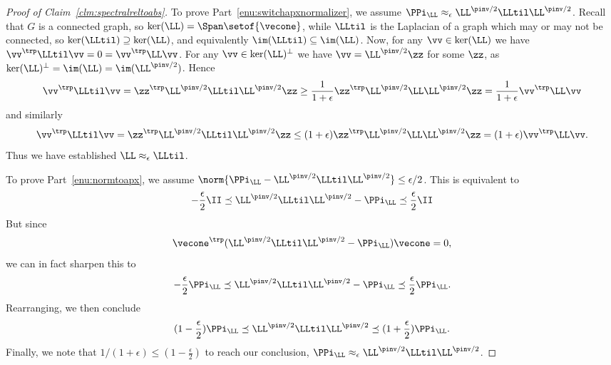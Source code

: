 \begin{proof}[Proof of Claim~\ref{clm:spectralreltoabs}]
  To prove Part~\ref{enu:switchapxnormalizer}, we
  assume $\PPi_{\LL} \approx_{\epsilon}
  \LL^{\pinv/2}\LLtil\LL^{\pinv/2}$.
  Recall that $G$ is a connected graph, so $\ker(\LL) =
  \Span\setof{\vecone}$, while $\LLtil$ is the Laplacian of a graph
which may or may not be connected, so $\ker(\LLtil) \supseteq
\ker(\LL)$, and equivalently $\im(\LLtil) \subseteq \im(\LL)$.
  Now, for any $\vv \in \ker(\LL)$ we have
  $\vv^{\trp} \LLtil \vv = 0 = \vv^{\trp} \LL \vv$.
  For any $\vv \in \ker(\LL)^{\perp}$ we have
  $\vv = \LL^{\pinv/2} \zz$ for some $\zz$, as $\ker(\LL)^{\perp} =
  \im(\LL) = \im(\LL^{\pinv/2})$.
  Hence
  \[
    \vv^{\trp} \LLtil \vv =
    \zz^{\trp} \LL^{\pinv/2}\LLtil\LL^{\pinv/2} \zz
    \geq
    \frac{1}{1+\epsilon}
     \zz^{\trp} \LL^{\pinv/2}\LL\LL^{\pinv/2} \zz
     =
     \frac{1}{1+\epsilon}
     \vv^{\trp} \LL \vv
   \]
and similarly
    \[
    \vv^{\trp} \LLtil \vv =
    \zz^{\trp} \LL^{\pinv/2}\LLtil\LL^{\pinv/2} \zz
    \leq
    (1+\epsilon)
     \zz^{\trp} \LL^{\pinv/2}\LL\LL^{\pinv/2} \zz
     =
    (1+\epsilon)
    \vv^{\trp} \LL \vv
    .
  \]
  Thus we have established  $\LL \approx_{\epsilon} \LLtil$.



  To prove Part~\ref{enu:normtoapx}, we assume $\norm{\PPi_{\LL} - \LL^{\pinv/2}\LLtil\LL^{\pinv/2}} \leq
  \epsilon/2$.
  This is equivalent to
  \[
   - \frac{\epsilon}{2} \II \preceq
    \LL^{\pinv/2}\LLtil\LL^{\pinv/2} - \PPi_{\LL} \preceq \frac{\epsilon}{2} \II
    \]
 But since
  \[
    \vecone^{\trp} (\LL^{\pinv/2}\LLtil\LL^{\pinv/2} - \PPi_{\LL})
    \vecone = 0,
  \]
  we can in fact sharpen this to
    \[
      - \frac{\epsilon}{2} \PPi_{\LL}
      \preceq
      \LL^{\pinv/2}\LLtil\LL^{\pinv/2} - \PPi_{\LL}
      \preceq
    \frac{\epsilon}{2} \PPi_{\LL}
    .
    \]
 Rearranging, we then conclude
 \[
   (1-\frac{\epsilon}{2}) \PPi_{\LL}
   \preceq
   \LL^{\pinv/2}\LLtil\LL^{\pinv/2}
    \preceq
    (1+\frac{\epsilon}{2}) \PPi_{\LL}
    .
  \]
Finally, we note that $1/(1+\epsilon) \leq (1-\frac{\epsilon}{2})$ to
reach our conclusion, $\PPi_{\LL} \approx_{\epsilon} \LL^{\pinv/2}\LLtil\LL^{\pinv/2}$.
\end{proof}

